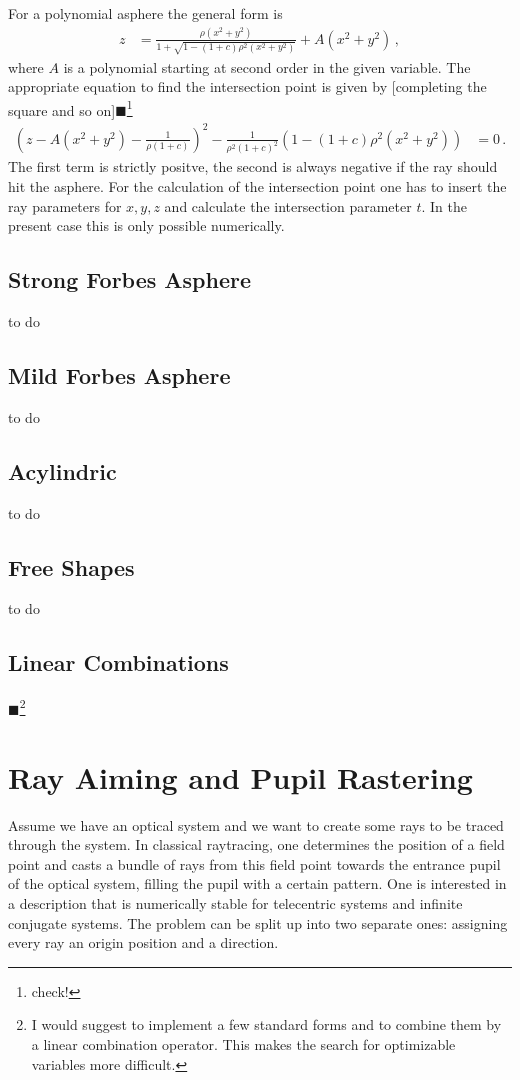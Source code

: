 \documentclass[12pt,a4paper,twoside,openright,BCOR10mm,headsepline,titlepage,abstracton,chapterprefix,final]{scrreprt}
\newcommand{\remark}[1]{{\color{red}$\blacksquare$}\footnote{{\color{red}#1}}}
\begin{document}
For a polynomial asphere the general form is
\begin{align}
  z &=  \frac
 { \rho ( x^2 + y^2 ) }
 { 1 + \sqrt{1 - (1+c) \rho^2  (x^2 + y^2)} } + A(x^2 + y^2)\,,
\end{align}
where $A$ is a polynomial starting at second order in the given variable.
The appropriate equation to find the intersection point is given by [completing the square and so on]\remark{check!}
\begin{align}
 \left(z - A(x^2 + y^2) - \frac{1}{\rho(1+c)}\right)^2 - \frac{1}{\rho^2 (1+c)^2} \left(1 -(1+c)\rho^2 (x^2 + y^2) \right) &= 0\,.
\end{align}
The first term is strictly positve, the second is always negative if the ray should hit the asphere. For the calculation
of the intersection point one has to insert the ray parameters for $x, y, z$ and calculate the intersection parameter $t$.
In the present case this is only possible numerically. 


\subsection{Strong Forbes Asphere}
to do
\subsection{Mild Forbes Asphere}
to do
\subsection{Acylindric}
to do

\subsection{Free Shapes}
to do

\subsection{Linear Combinations}
\remark{I would suggest to implement a few standard forms and to combine them by a linear combination operator. This makes the search for optimizable
variables more difficult.}

\section{Ray Aiming and Pupil Rastering}
Assume we have an optical system and we want to create some rays to be traced through the system. 
In classical raytracing, one determines the position of a field point and casts a bundle of rays from this field point towards the entrance pupil of the optical system, filling the pupil with a certain pattern.
One is interested in a description that is numerically stable for telecentric systems and infinite conjugate systems.
The problem can be split up into two separate ones: assigning every ray an origin position and a direction.
\end{document}
